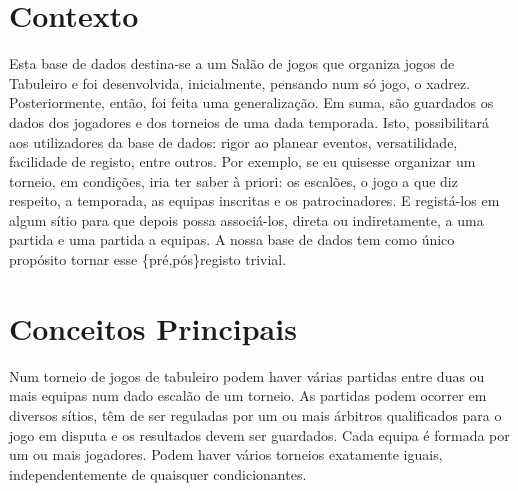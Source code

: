 \documentclass[a4paper]{article}
\begin{document}
\newpage






\section{Contexto}
Esta base de dados destina-se a um Salão de jogos que organiza jogos de Tabuleiro e foi desenvolvida, inicialmente, pensando num só jogo, o xadrez. Posteriormente, então, foi feita uma generalização. Em suma, são guardados os dados dos jogadores e dos torneios de uma dada temporada. Isto, possibilitará aos utilizadores da base de dados: rigor ao planear eventos, versatilidade, facilidade de registo, entre outros. Por exemplo, se eu quisesse organizar um torneio, em condições, iria ter saber à priori: os escalões, o jogo a que diz respeito, a temporada, as equipas inscritas e os patrocinadores. E registá-los em algum sítio para que depois possa associá-los, direta ou indiretamente, a uma partida e uma partida a equipas. A nossa base de dados tem como único propósito tornar esse \{pré,pós\}registo trivial.

\section{Conceitos Principais}
Num torneio de jogos de tabuleiro podem haver várias partidas entre duas ou mais equipas num dado escalão de um torneio. As partidas podem ocorrer em diversos sítios, têm de ser reguladas por um ou mais árbitros qualificados para o jogo em disputa e os resultados devem ser guardados. Cada equipa é formada por um ou mais jogadores. Podem haver vários torneios exatamente iguais, independentemente de quaisquer condicionantes.

\end{document}
